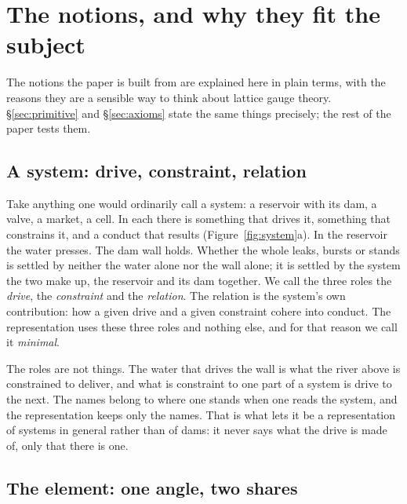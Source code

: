 \documentclass[11pt,a4paper]{article}
\theoremstyle{plain}
\theoremstyle{definition}
\theoremstyle{remark}
\begin{document}
\clearpage
\section{The notions, and why they fit the subject}\label{sec:notions}

The notions the paper is built from are explained here in plain terms, with the reasons they are a sensible way to think about lattice gauge theory. \S\ref{sec:primitive} and \S\ref{sec:axioms} state the same things precisely; the rest of the paper tests them.

\subsection{A system: drive, constraint, relation}

Take anything one would ordinarily call a system: a reservoir with its dam, a valve, a market, a cell. In each there is something that drives it, something that constrains it, and a conduct that results (Figure~\ref{fig:system}a). In the reservoir the water presses. The dam wall holds. Whether the whole leaks, bursts or stands is settled by neither the water alone nor the wall alone; it is settled by the system the two make up, the reservoir and its dam together. We call the three roles the \emph{drive}, the \emph{constraint} and the \emph{relation}. The relation is the system's own contribution: how a given drive and a given constraint cohere into conduct. The representation uses these three roles and nothing else, and for that reason we call it \emph{minimal}.

The roles are not things. The water that drives the wall is what the river above is constrained to deliver, and what is constraint to one part of a system is drive to the next. The names belong to where one stands when one reads the system, and the representation keeps only the names. That is what lets it be a representation of systems in general rather than of dams: it never says what the drive is made of, only that there is one.

\subsection{The element: one angle, two shares}
\end{document}
